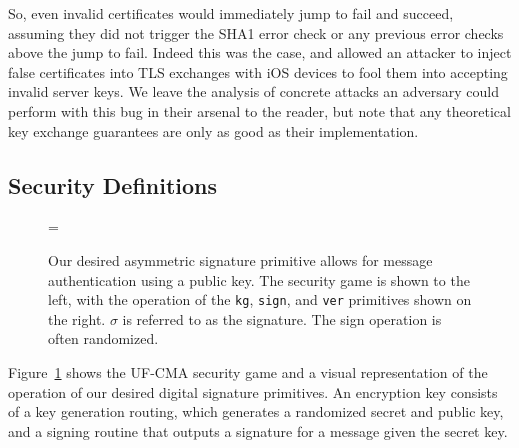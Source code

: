 So, even invalid certificates would immediately jump to fail and succeed, assuming they did not trigger the SHA1 error check or any previous error checks above the jump to fail.  Indeed this was the case, and allowed an attacker to inject false certificates into TLS exchanges with iOS devices to fool them into accepting invalid server keys.  We leave the analysis of concrete attacks an adversary could perform with this bug in their arsenal to the reader, but note that any theoretical key exchange guarantees are only as good as their implementation.

\subsection{Security Definitions}

\begin{figure}[h]
\centering
{}

\bnm
  \AdvUFCMA{\DS}{\advA} = \Prob{\UFCMA_{\DS}^\advA\Rightarrow\true}
\enm

  \caption{Our desired asymmetric signature primitive allows for message authentication using a public key.  The security game is shown to the left, with the operation of the \texttt{kg}, \texttt{sign}, and \texttt{ver} primitives shown on the right.  $\sigma$ is referred to as the signature.  The sign operation is often randomized.  }
\label{fig:digsigvisual}
\end{figure}

Figure~\ref{fig:digsigvisual} shows the UF-CMA security game and a visual representation of the operation of our desired digital signature primitives.  An encryption key consists of a key generation routing, which generates a randomized secret and public key, and a signing routine that outputs a signature for a message given the secret key.

